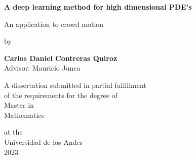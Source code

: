\begin{titlepage}
    \begin{center}
        \vspace*{1cm}
        
        \Huge
        \textbf{A deep learning method for high dimensional PDE's}
        
        \vspace{0.5cm}
        \LARGE
        An application to crowd motion\\
        \vspace{0.5cm}
   
        by\\
        \vspace{0.5cm}
    
        \textbf{Carlos Daniel Contreras Quiroz}\\
        \vspace*{1cm}
        Advisor: Mauricio Junca
        
        \vfill
        
        A dissertation submitted in partial fulfillment\\
        of the requirements for the degree of\\
        Master in\\
        Mathematics\\
    
        
        \vspace{1.8cm}

        
        \Large
        at the\\Universidad de los Andes\\
        2023\\
        \vspace{1.0cm}
       
        
    \end{center}
    
\end{titlepage}